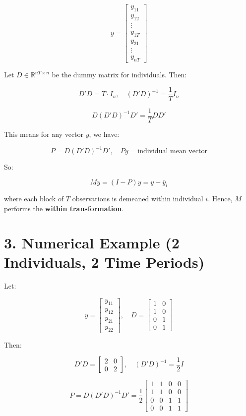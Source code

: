 \documentclass[12pt, oneside]{article}
\begin{document}
\[
y = \begin{bmatrix}
y_{11} \\
y_{12} \\
\vdots \\
y_{1T} \\
y_{21} \\
\vdots \\
y_{nT}
\end{bmatrix}
\]

Let \( D \in \mathbb{R}^{nT \times n} \) be the dummy matrix for individuals. Then:

\[
D'D = T \cdot I_n, \quad (D'D)^{-1} = \frac{1}{T} I_n
\]

\[
D(D'D)^{-1}D' = \frac{1}{T} DD'
\]

This means for any vector \( y \), we have:

\[
P = D(D'D)^{-1}D', \quad Py = \text{individual mean vector}
\]

So:

\[
My = (I - P)y = y - \bar{y}_i
\]

where each block of \( T \) observations is demeaned within individual \( i \). Hence, \( M \) performs the \textbf{within transformation}.

\section*{3. Numerical Example (2 Individuals, 2 Time Periods)}

Let:

\[
y = \begin{bmatrix}
y_{11} \\
y_{12} \\
y_{21} \\
y_{22}
\end{bmatrix}, \quad
D = \begin{bmatrix}
1 & 0 \\
1 & 0 \\
0 & 1 \\
0 & 1
\end{bmatrix}
\]

Then:

\[
D'D = \begin{bmatrix}
2 & 0 \\
0 & 2
\end{bmatrix}, \quad
(D'D)^{-1} = \frac{1}{2} I
\]

\[
P = D(D'D)^{-1}D' = \frac{1}{2} \begin{bmatrix}
1 & 1 & 0 & 0 \\
1 & 1 & 0 & 0 \\
0 & 0 & 1 & 1 \\
0 & 0 & 1 & 1
\end{bmatrix}
\]
\end{document}
